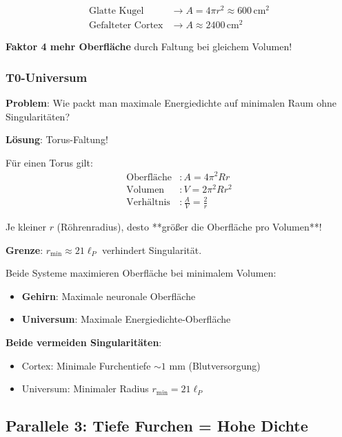 	\begin{align}
		\text{Glatte Kugel} &\to A = 4\pi r^2 \approx 600\,\text{cm}^2 \\
		\text{Gefalteter Cortex} &\to A \approx 2400\,\text{cm}^2
	\end{align}
	
	\textbf{Faktor 4 mehr Oberfläche} durch Faltung bei gleichem Volumen!
	
	\subsubsection{T0-Universum}
	
	\textbf{Problem}: Wie packt man maximale Energiedichte auf minimalen Raum ohne Singularitäten?
	
	\textbf{Lösung}: Torus-Faltung!
	
	Für einen Torus gilt:
	\begin{align}
		\text{Oberfläche} &: A = 4\pi^2 R r \\
		\text{Volumen} &: V = 2\pi^2 R r^2 \\
		\text{Verhältnis} &: \frac{A}{V} = \frac{2}{r}
	\end{align}
	
	Je kleiner $r$ (Röhrenradius), desto **größer die Oberfläche pro Volumen**!
	
	\textbf{Grenze}: $r_{\min} \approx 21 \ell_P$ verhindert Singularität.
	
	\begin{keyresult}
		Beide Systeme maximieren Oberfläche bei minimalem Volumen:
		
		\begin{itemize}
			\item \textbf{Gehirn}: Maximale neuronale Oberfläche
			\item \textbf{Universum}: Maximale Energiedichte-Oberfläche
		\end{itemize}
		
		\textbf{Beide vermeiden Singularitäten}:
		\begin{itemize}
			\item Cortex: Minimale Furchentiefe $\sim 1$ mm (Blutversorgung)
			\item Universum: Minimaler Radius $r_{\min} = 21 \ell_P$
		\end{itemize}
	\end{keyresult}
	
	\subsection{Parallele 3: Tiefe Furchen = Hohe Dichte}
	

